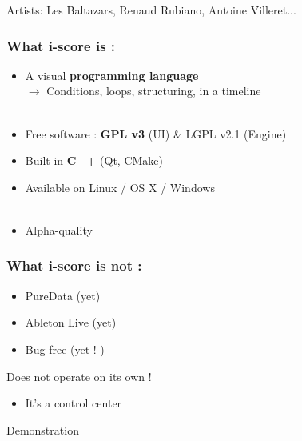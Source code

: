 \documentclass{beamer}
\begin{document}
\begin{frame}
    {\large Artists: Les Baltazars, Renaud Rubiano, Antoine Villeret...}
    
\end{frame}

    \begin{frame}
        \frametitle{What i-score is : }
        \Large
        \begin{itemize}        
        \item<1-> A visual \textbf{programming language} \\ $\rightarrow$ Conditions, loops, structuring, in a timeline\\~\\
        \item<2-> Free software : \textbf{GPL v3 }(UI) \& LGPL v2.1 (Engine)
        \item<2-> Built in \textbf{C++} (Qt, CMake)        
        \item<2-> Available on Linux / OS X / Windows\\ ~\\
        \item<3-> Alpha-quality 
        \end{itemize}
    \end{frame}
    \begin{frame}
        \frametitle{What i-score is not : }
        \Large
        \begin{itemize} [<+->]
            \item PureData (yet)
            \item Ableton Live (yet)       
            \item Bug-free (yet ! )
        \end{itemize}
        \vspace{2em}
        
        \pause[\thebeamerpauses]
        \Huge Does not operate on its own !
        \Large
        \begin{itemize} 
            \item  It's a control center
        \end{itemize}
    \end{frame}
    
    \begin{frame}
    	\centering \Huge Demonstration
    \end{frame}
    
\end{document}
